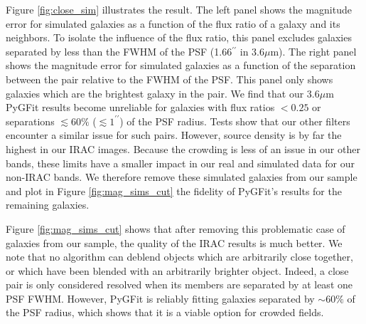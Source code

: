 \documentclass[preprint]{aastex}
\newcommand{\sersic}{S\'{e}rsic}
\newcommand{\pygfit}{PyGFit}
\begin{document}

Figure \ref{fig:close_sim} illustrates the result.  The left panel shows the magnitude error for simulated galaxies as a function of the flux ratio of a galaxy and its neighbors.  To isolate the influence of the flux ratio, this panel excludes galaxies separated by less than the FWHM of the PSF (1.66$^{\prime\prime}$ in $3.6\mu$m).  The right panel shows the magnitude error for simulated galaxies as a function of the separation between the pair relative to the FWHM of the PSF.  This panel only shows galaxies which are the brightest galaxy in the pair.  We find that our $3.6\mu$m \pygfit{} results become unreliable for galaxies with flux ratios $<0.25$ or separations $\lesssim60\%$ ($\lesssim1^{\prime\prime}$) of the PSF radius.  Tests show that our other filters encounter a similar issue for such pairs.  However, source density is by far the highest in our IRAC images.  Because the crowding is less of an issue in our other bands, these limits have a smaller impact in our real and simulated data for our non-IRAC bands.  We therefore remove these simulated galaxies from our sample and plot in Figure \ref{fig:mag_sims_cut} the fidelity of \pygfit{}'s results for the remaining galaxies.

Figure \ref{fig:mag_sims_cut} shows that after removing this problematic case of galaxies from our sample, the quality of the IRAC results is much better.  We note that no algorithm can deblend objects which are arbitrarily close together, or which have been blended with an arbitrarily brighter object.  Indeed, a close pair is only considered resolved when its members are separated by at least one PSF FWHM.  However, \pygfit{} is reliably fitting galaxies separated by $\sim60\%$ of the PSF radius, which shows that it is a viable option for crowded fields.
\end{document}
